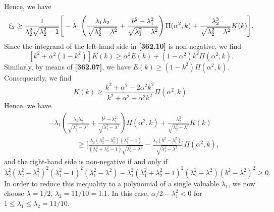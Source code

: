 \documentclass[11pt]{amsart}
\numberwithin{equation}{section}
\numberwithin{figure}{section}
\theoremstyle{plain} %
\theoremstyle{definition} %
\begin{document}
Hence, we have 
\begin{equation}\label{key_6}
\xi_2 
\geq \frac{1}{\lambda_2^2\sqrt{\lambda_2^2-1}}
\Bigg[ 
-\lambda_1 \left( \frac{\lambda_1\lambda_2}{\sqrt{\lambda_2^2-\lambda^2}} +\frac{b^2-\lambda_1^2}{\sqrt{\lambda_1^2-\lambda^2}}\right) \Pi (\alpha^2,k) \\
+\frac{\lambda_2^3}{\sqrt{\lambda_2^2-\lambda^2}} K (k) 
\Bigg]. 
\end{equation}
Since the integrand of the left-hand side in \textbf{[362.10]} is non-negative, 
we find 
\[
[k^2+\alpha^2 (1-k^2)] K (k) \geq \alpha^2 E (k) + (1-\alpha^2) k^2 \Pi (\alpha^2,k). 
\]
Similarly, by means of \textbf{[362.07]}, we have $E(k) \geq (1-k^2) \Pi (\alpha^2,k)$. 
Consequently, we find 
\[
K (k) \geq \frac{k^2+\alpha^2 -2\alpha^2 k^2}{k^2+\alpha^2 -\alpha^2 k^2} \Pi (\alpha^2,k). 
\]
Hence, we have 
\begin{align*}
& -\lambda_1 \left( \frac{\lambda_1\lambda_2}{\sqrt{\lambda_2^2-\lambda^2}} +\frac{b^2-\lambda_1^2}{\sqrt{\lambda_1^2-\lambda^2}}\right) \Pi (\alpha^2,k) +\frac{\lambda_2^3}{\sqrt{\lambda_2^2-\lambda^2}} K (k) \\
&\qquad \qquad \geq \bigg[ 
\frac{\lambda_2 (\lambda_2^2-\lambda_1^2)(\lambda_1^2-1)}{(\lambda_1^2+\lambda_2^2-1) \sqrt{\lambda_2^2-\lambda^2}}-\frac{\lambda_1 (b^2-\lambda_1^2)}{\sqrt{\lambda_1^2-\lambda^2}}
\bigg] \Pi (\alpha^2,k),  
\end{align*}
and the right-hand side is non-negative if and only if 
\[
\lambda_2^2 (\lambda_2^2-\lambda_1^2)^2 (\lambda_1^2-1)^2 (\lambda_1^2-\lambda^2)
-\lambda_1^2(\lambda_1^2+\lambda_2^2-1)^2 (\lambda_2^2-\lambda^2)(b^2-\lambda_1^2)^2\geq 0. 
\]
In order to reduce this inequality to a polynomial of a single valuable $\lambda_1$, 
we now choose $\lambda=1/2$, $\lambda_2=11/10=1.1$. In this case, 
$\alpha/2-\lambda_1^2<0$ for $1\leq \lambda_1\leq \lambda_2=11/10$. 
\end{document}
